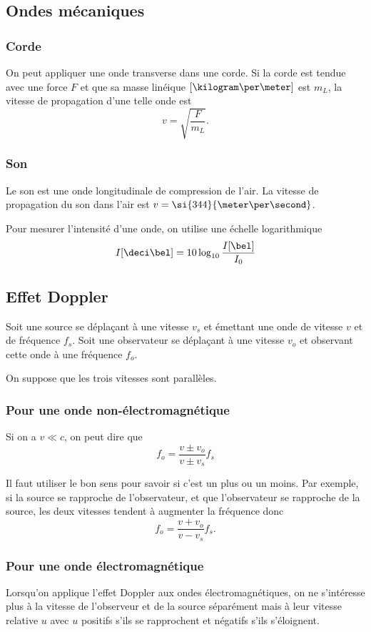 \subsection{Ondes mécaniques}
\subsubsection{Corde}
On peut appliquer une onde transverse dans une corde.
Si la corde est tendue avec une force $F$ et que
sa masse linéique $[\kilogram\per\meter]$ est $m_L$,
la vitesse de propagation d'une telle onde est
\[ v = \sqrt{\frac{F}{m_L}}. \]

\subsubsection{Son}
Le son est une onde longitudinale de compression de l'air.
La vitesse de propagation du son dans l'air est
$v = \si{344}{\meter\per\second}$.

Pour mesurer l'intensité d'une onde, on utilise une échelle logarithmique
\[ I[\deci\bel] = 10 \log_{10}\frac{I[\bel]}{I_0} \]

\subsection{Effet Doppler}
Soit une source se déplaçant à une vitesse $v_s$ et émettant
une onde de vitesse $v$ et de fréquence $f_s$.
Soit une observateur se déplaçant à une vitesse $v_o$ et
observant cette onde à une fréquence $f_o$.

On suppose que les trois vitesses sont parallèles.

\subsubsection{Pour une onde non-électromagnétique}
Si on a $v \ll c$, on peut dire que
\[ f_o = \frac{v \pm v_o}{v \pm v_s} f_s \]

Il faut utiliser le bon sens pour savoir si c'est un plus ou un moins.
Par exemple, si la source se rapproche de l'observateur, et que
l'observateur se rapproche de la source, les deux vitesses
tendent à augmenter la fréquence donc
\[ f_o = \frac{v + v_o}{v - v_s} f_s. \]

\subsubsection{Pour une onde électromagnétique}
Lorsqu'on applique l'effet Doppler aux ondes électromagnétiques,
on ne s'intéresse plus à la vitesse de l'observeur et de la source séparément
mais à leur vitesse relative $u$ avec $u$ positifs s'ils se rapprochent
et négatifs s'ils s'éloignent.

